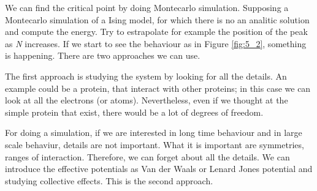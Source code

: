 \documentclass[../main/main.tex]{subfiles}
\begin{document}
We can find the critical point by doing Montecarlo simulation. Supposing a Montecarlo simulation of a Ising model, for which there is no an analitic solution and compute the energy.
Try to estrapolate for example the position of the peak as \emph{N} increases. If we start to see the behaviour as in Figure \ref{fig:5_2}, something is happening.
There are two approaches we can use.

 The first approach is studying the system by looking for all the details. An example could be a protein, that interact with other proteins; in this case we can look at all the electrons (or atoms). Nevertheless, even if we thought at the simple protein that exist, there would be a lot of degrees of freedom.

  For doing a simulation, if we are interested in long time behaviour and in large scale behaviur, details are not important. What it is important are symmetries, ranges of interaction. Therefore, we can forget about all the details. We can introduce the effective potentials as Van der Waals or Lenard Jones potential and studying collective effects. This is the second approach.
\end{document}
